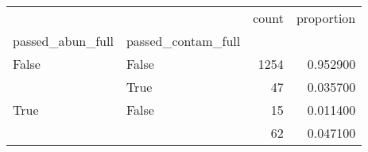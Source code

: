 \begin{tabular}{llrr}
\toprule
 &  & count & proportion \\
passed_abun_full & passed_contam_full &  &  \\
\midrule
False & False & 1254 & 0.952900 \\
\cline{1-4}
\multirow[t]{3}{*}{True} & True & 47 & 0.035700 \\
 & False & 15 & 0.011400 \\
 &  & 62 & 0.047100 \\
\cline{1-4}
\bottomrule
\end{tabular}
